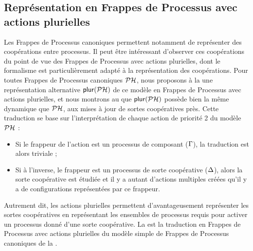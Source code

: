\subsection{Représentation en Frappes de Processus avec actions plurielles}

Les Frappes de Processus canoniques permettent notamment de représenter des coopérations
entre processus.
Il peut être intéressant d'observer ces coopérations du point de vue des
Frappes de Processus avec actions plurielles, dont le formalisme est particulièrement
adapté à la représentation des coopérations.
Pour toutes Frappes de Processus canoniques $\mathcal{PH}$, nous proposons à la 
une représentation alternative $\mathsf{plur}(\mathcal{PH})$ de ce modèle en Frappes de Processus avec
actions plurielles, et nous montrons au  que $\mathsf{plur}(\mathcal{PH})$
possède bien la même dynamique que $\mathcal{PH}$, aux mises à jour de sortes coopératives près.
Cette traduction se base sur l'interprétation de chaque action de priorité 2 du modèle $\mathcal{PH}$ :
\begin{itemize}
  \item Si le frappeur de l'action est un processus de composant ($\Gamma$),
    la traduction est alors triviale ;
  \item Si à l'inverse, le frappeur est un processus de sorte coopérative ($\Delta$),
    alors la sorte coopérative est étudiée et il y a autant d'actions multiples
    créées qu'il y a de configurations représentées par ce frappeur.
\end{itemize}
Autrement dit, les actions plurielles permettent d'avantageusement représenter
les sortes coopératives en représentant les ensembles de processus requis pour activer
un processus donné d'une sorte coopérative.
La  est la traduction en Frappes de Processus avec actions plurielles
du modèle simple de Frappes de Processus canoniques de la .


